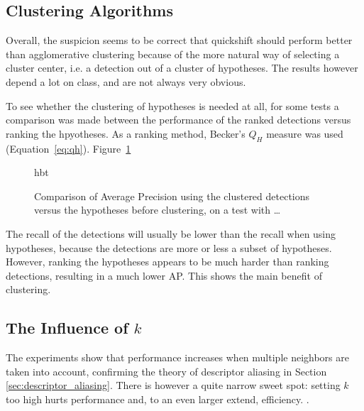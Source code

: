 

\subsection{Clustering Algorithms} %
\label{sub:anal_clustering_algorithms}

Overall, the suspicion seems to be correct that quickshift should perform better than agglomerative clustering because of the more natural way of selecting a cluster center, i.e. a detection out of a cluster of hypotheses. The results however depend a lot on class, and are not always very obvious.

To see whether the clustering of hypotheses is needed at all, for some tests a comparison was made between the performance of the ranked detections versus ranking the hpyotheses. As a ranking method, Becker's $Q_H$ measure was used (Equation~\ref{eq:qh}). Figure~\ref{fig:hyprank}

\begin{figure}{hbt}
    \centering
    \caption{Comparison of Average Precision using the clustered detections versus the hypotheses before clustering, on a test with \ldots}
    \label{fig:hyprank}
\end{figure}

The recall of the detections will usually be lower than the recall when using hypotheses, because the detections are more or less a subset of hypotheses. However, ranking the hypotheses appears to be much harder than ranking detections, resulting in a much lower AP. This shows the main benefit of clustering.


\subsection{The Influence of $k$} %
\label{sub:the_influence_of_k_}

The experiments show that performance increases when multiple neighbors are taken into account, confirming the theory of descriptor aliasing in Section \ref{sec:descriptor_aliasing}. There is however a quite narrow sweet spot: setting $k$ too high hurts performance and, to an even larger extend, efficiency. .


